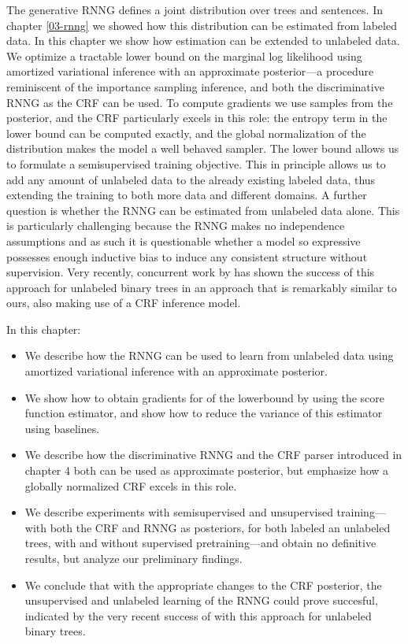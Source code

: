The generative RNNG defines a joint distribution over trees and sentences. In chapter \ref{03-rnng} we showed how this distribution can be estimated from labeled data. In this chapter we show how estimation can be extended to unlabeled data. We optimize a tractable lower bound on the marginal log likelihood using amortized variational inference with an approximate posterior---a procedure reminiscent of the importance sampling inference, and both the discriminative RNNG as the CRF can be used. To compute gradients we use samples from the posterior, and the CRF particularly excels in this role: the entropy term in the lower bound can be computed exactly, and the global normalization of the distribution makes the model a well behaved sampler. The lower bound allows us to formulate a semisupervised training objective. This in principle allows us to add any amount of unlabeled data to the already existing labeled data, thus extending the training to both more data and different domains. A further question is whether the RNNG can be estimated from unlabeled data alone. This is particularly challenging because the RNNG makes no independence assumptions and as such it is questionable whether a model so expressive possesses enough inductive bias to induce any consistent structure without supervision. Very recently, concurrent work by \citet{kim2019unsupervised} has shown the success of this approach for unlabeled binary trees in an approach that is remarkably similar to ours, also making use of a CRF inference model.

In this chapter:
\begin{itemize}
  \item We describe how the RNNG can be used to learn from unlabeled data using amortized variational inference with an approximate posterior.
  \item We show how to obtain gradients for of the lowerbound by using the score function estimator, and show how to reduce the variance of this estimator using baselines.
  \item We describe how the discriminative RNNG and the CRF parser introduced in chapter 4 both can be used as approximate posterior, but emphasize how a globally normalized CRF excels in this role.
  \item We describe experiments with semisupervised and unsupervised training---with both the CRF and RNNG as posteriors, for both labeled an unlabeled trees, with and without supervised pretraining---and obtain no definitive results, but analyze our preliminary findings.
  \item We conclude that with the appropriate changes to the CRF posterior, the unsupervised and unlabeled learning of the RNNG could prove succesful, indicated by the very recent success of \citet{kim2019unsupervised} with this approach for unlabeled binary trees.
\end{itemize}


